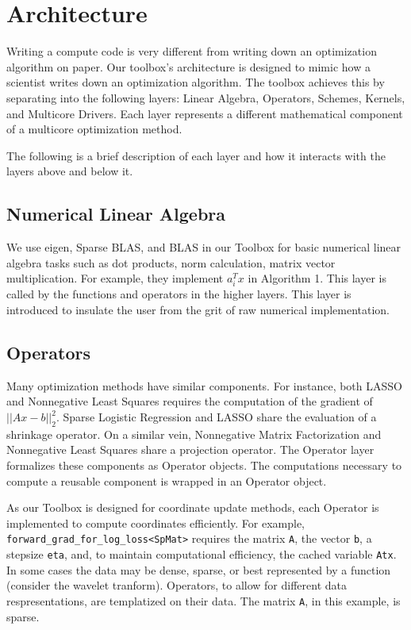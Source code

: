 \section{Architecture}

Writing a compute code is very different from writing down an optimization algorithm on paper.
Our toolbox's architecture is designed to mimic how a scientist writes down an optimization algorithm.
The toolbox achieves this by separating into the following layers: Linear Algebra, Operators, Schemes, Kernels, and Multicore Drivers.
Each layer represents a different mathematical component of a multicore optimization method. 

The following is a brief description of each layer and how it interacts with the layers above and below it.

\subsection{Numerical Linear Algebra}

We use eigen, Sparse BLAS, and BLAS in our Toolbox for basic 
numerical linear algebra tasks such as dot products, norm calculation, matrix vector multiplication.
For example, they implement $a_i^T x$ in Algorithm 1. This layer is called by the functions and operators in the higher layers. This layer is introduced to insulate the user from the grit of raw numerical implementation. 

\subsection{Operators}

Many optimization methods have similar components.
For instance, both LASSO and Nonnegative Least Squares requires the computation of the gradient of $||Ax-b||_2^2$.
Sparse Logistic Regression and LASSO share the evaluation of a shrinkage operator.
On a similar vein, Nonnegative Matrix Factorization and Nonnegative Least Squares share a projection operator.
The Operator layer formalizes these components as Operator objects.
The computations necessary to compute a reusable component is wrapped in an Operator object.


As our Toolbox is designed for coordinate update methods, each Operator is implemented to compute coordinates efficiently. For example, \texttt{forward\_grad\_for\_log\_loss<SpMat>} requires the matrix \texttt{A}, the vector \texttt{b}, a stepsize \texttt{eta},  and, to maintain computational efficiency, the cached variable \texttt{Atx}.
In some cases the data may be dense, sparse, or best represented by a function (consider the wavelet tranform).
Operators, to allow for different data respresentations, are templatized on their data.
The matrix \texttt{A}, in this example, is sparse.

